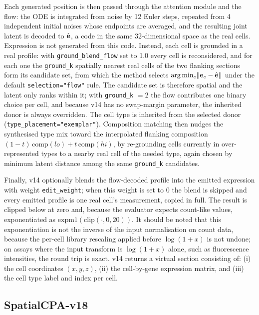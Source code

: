 Each generated position is then passed through the attention module and the flow: the ODE is
integrated from noise by 12 Euler steps, repeated from 4 independent initial noises whose endpoints
are averaged, and the resulting joint latent is decoded to $\hat{\textrm{\textbf{e}}}$, a code in the
same 32-dimensional space as the real cells. Expression is not generated from this code. Instead, each
cell is grounded in a real profile: with \texttt{ground\_blend\_flow} set to 1.0 every cell is
reconsidered, and for each one the \texttt{ground\_k} spatially nearest real cells of the two flanking
sections form its candidate set, from which the method selects
$\arg\min_{c} \lVert \textrm{\textbf{e}}_{c} - \hat{\textrm{\textbf{e}}} \rVert$ under the default
\texttt{selection="flow"} rule. The candidate set is therefore spatial and the latent only ranks
within it; with \texttt{ground\_k} $= 2$ the flow contributes one binary choice per cell, and because
v14 has no swap-margin parameter, the inherited donor is always overridden. The cell type is inherited
from the selected donor (\texttt{type\_placement="exemplar"}). Composition matching then nudges the
synthesised type mix toward the interpolated flanking composition $(1-t) \, \textrm{comp}(lo) + t \,
\textrm{comp}(hi)$, by re-grounding cells currently in over-represented types to a nearby real cell of
the needed type, again chosen by minimum latent distance among the same \texttt{ground\_k} candidates.

Finally, v14 optionally blends the flow-decoded profile into the emitted expression with weight
\texttt{edit\_weight}; when this weight is set to 0 the blend is skipped and every emitted profile is
one real cell's measurement, copied in full. The result is clipped below at zero and, because the
evaluator expects count-like values, exponentiated as $\textrm{expm1}\left(\textrm{clip}(\cdot, 0,
20)\right)$. It should be noted that this exponentiation is not the inverse of the input
normalisation on count data, because the per-cell library rescaling applied before $\log(1+x)$ is not
undone; on assays where the input transform is $\log(1+x)$ alone, such as fluorescence intensities,
the round trip is exact. v14 returns a virtual section consisting of: (i) the cell coordinates
$(x, y, z)$, (ii) the cell-by-gene expression matrix, and (iii) the cell type label and index per
cell.


\subsection{SpatialCPA-v18} \label{subsec:spatialcpav18}


